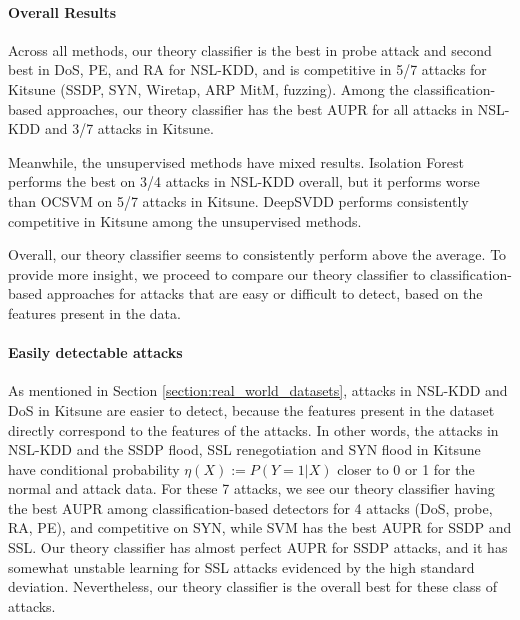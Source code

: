 \documentclass{article}
\begin{document}
\paragraph*{Overall Results}
Across all methods, our theory classifier is the best in probe attack and second best in DoS, PE, and RA for NSL-KDD, and is competitive in 5/7 attacks for Kitsune (SSDP, SYN, Wiretap, ARP MitM, fuzzing).
Among the classification-based approaches, our theory classifier has the best AUPR for all attacks in NSL-KDD and 3/7 attacks in Kitsune.
% 

Meanwhile, the unsupervised methods have mixed results. Isolation Forest performs the best on 3/4 attacks in NSL-KDD overall, but it performs worse than OCSVM on 5/7 attacks in Kitsune. DeepSVDD performs consistently competitive in Kitsune among the unsupervised methods. 

Overall, our theory classifier seems to consistently perform above the average.
To provide more insight, we proceed to compare our theory classifier to classification-based approaches for attacks that are easy or difficult to detect, based on the features present in the data.

\paragraph*{Easily detectable attacks}
As mentioned in Section \ref{section:real_world_datasets}, attacks in NSL-KDD and DoS in Kitsune are easier to detect, because the features present in the dataset directly correspond to the features of the attacks.
In other words, the attacks in NSL-KDD and the SSDP flood, SSL renegotiation and SYN flood in Kitsune have conditional probability $\eta(X):=P(Y=1|X)$ closer to 0 or 1 for the normal and attack data.
For these 7 attacks, we see our theory classifier having the best AUPR among classification-based detectors for 4 attacks (DoS, probe, RA, PE), and competitive on SYN, while SVM has the best AUPR for SSDP and SSL.
Our theory classifier has almost perfect AUPR for SSDP attacks, and it has somewhat unstable learning for SSL attacks evidenced by the high standard deviation.
Nevertheless, our theory classifier is the overall best for these class of attacks.
\end{document}

